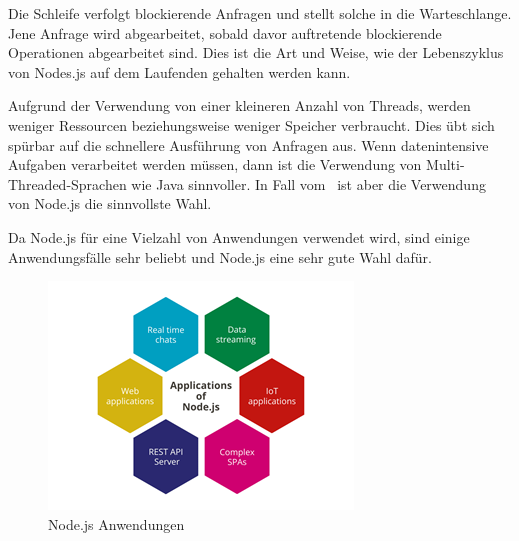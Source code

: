 Die Schleife verfolgt blockierende Anfragen und stellt solche in die Warteschlange. Jene Anfrage wird abgearbeitet, sobald davor auftretende blockierende Operationen abgearbeitet sind. Dies ist die Art und Weise, wie der Lebenszyklus von Nodes.js auf dem Laufenden gehalten werden kann.

Aufgrund der Verwendung von einer kleineren Anzahl von Threads, werden weniger Ressourcen beziehungsweise weniger Speicher verbraucht. Dies übt sich spürbar auf die schnellere Ausführung von Anfragen aus. Wenn datenintensive Aufgaben verarbeitet werden müssen, dann ist die Verwendung von Multi-Threaded-Sprachen wie Java sinnvoller. In Fall vom \ZELIA\ ist aber die Verwendung von Node.js die sinnvollste Wahl. \cite{Arocom}


Da Node.js für eine Vielzahl von Anwendungen verwendet wird, sind einige Anwendungsfälle sehr beliebt und Node.js eine sehr gute Wahl dafür.

\begin{figure}[H]
    \centering
    \includegraphics{media/NodeJs/NodeJsAnwendungen.png}
    \caption{Node.js Anwendungen \cite{AnwendungenFoto}}
\end{figure}

